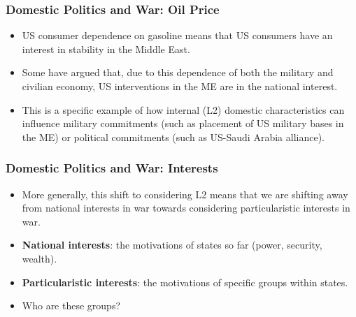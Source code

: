 \documentclass[handout]{beamer}
\begin{document}
\begin{frame} 
	\frametitle{\LARGE{Domestic Politics and War: Oil Price}}
	\begin{itemize}
		\item US consumer dependence on gasoline means that US consumers have an interest in stability in the Middle East. \pause
		\item Some have argued that, due to this dependence of both the military and civilian economy, US interventions in the ME are in the national interest. \pause
		\item This is a specific example of how internal (L2) domestic characteristics can influence military commitments (such as placement of US military bases in the ME) or political commitments (such as US-Saudi Arabia alliance).
	\end{itemize}
\end{frame}

\begin{frame} 
	\frametitle{\LARGE{Domestic Politics and War: Interests}}
	\begin{itemize}
		\item More generally, this shift to considering L2 means that we are shifting away from national interests in war towards considering particularistic interests in war. \pause
		\item \textbf{National interests}: the motivations of states so far (power, security, wealth). \pause
		\item \textbf{Particularistic interests}: the motivations of specific groups within states. \pause
		\item Who are these groups?
	\end{itemize}
\end{frame}
\end{document}
